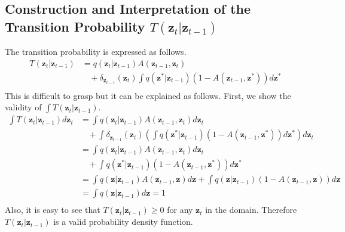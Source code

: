 \documentclass[a4]{article}
\begin{document}
\subsection{Construction and Interpretation of the Transition Probability $T\left(\bm{z}_{t}|\bm{z}_{t-1}\right)$}
The transition probability is expressed as follows.
\begin{equation}
\begin{aligned}
T\left(\bm{z}_{t}|\bm{z}_{t-1}\right)
&= q\left(\bm{z}_{t}|\bm{z}_{t-1}\right)A\left(\bm{z}_{t-1}, \bm{z}_{t}\right)\\
&\:\:\:\:+ \delta_{\bm{z}_{t-1}}\left(\bm{z}_{t}\right)
\int q\left(\bm{z}^*|\bm{z}_{t-1}\right)\left(1 - A\left(\bm{z}_{t-1}, \bm{z}^*\right)\right)d\bm{z}^*
\label{eq:definition_T}\\
\end{aligned}
\end{equation}
This is difficult to grasp but it can be explained as follows.
First, we show the validity of $\int T\left(\bm{z}_{t}|\bm{z}_{t-1}\right)$.
\begin{equation}
\begin{aligned}
\int T\left(\bm{z}_{t}|\bm{z}_{t-1}\right)d\bm{z}_t
&= \int q\left(\bm{z}_{t}|\bm{z}_{t-1}\right)A\left(\bm{z}_{t-1}, \bm{z}_{t}\right)d\bm{z}_t\\
&\:\:\:\:+ \int \delta_{\bm{z}_{t-1}}\left(\bm{z}_{t}\right)
\left(\int q\left(\bm{z}^*|\bm{z}_{t-1}\right)\left(1 - A\left(\bm{z}_{t-1}, \bm{z}^*\right)\right)d\bm{z}^*\right) d\bm{z}_t\\
&= \int q\left(\bm{z}_{t}|\bm{z}_{t-1}\right)A\left(\bm{z}_{t-1}, \bm{z}_{t}\right)d\bm{z}_t\\
&\:\:\:\:+ \int q\left(\bm{z}^*|\bm{z}_{t-1}\right)\left(1 - A\left(\bm{z}_{t-1}, \bm{z}^*\right)\right)d\bm{z}^*\\
&= \int q\left(\bm{z}|\bm{z}_{t-1}\right)A\left(\bm{z}_{t-1}, \bm{z}\right)d\bm{z}
+ \int q\left(\bm{z}|\bm{z}_{t-1}\right)\left(1 - A\left(\bm{z}_{t-1}, \bm{z}\right)\right)d\bm{z}\\
&= \int q\left(\bm{z}|\bm{z}_{t-1}\right)d\bm{z} = 1\\
\end{aligned}
\end{equation}
Also, it is easy to see that $T\left(\bm{z}_{t}|\bm{z}_{t-1}\right) \ge 0$ for any $\bm{z}_t$ in the domain.
Therefore $T\left(\bm{z}_{t}|\bm{z}_{t-1}\right)$ is a valid probability density function.
\end{document}
